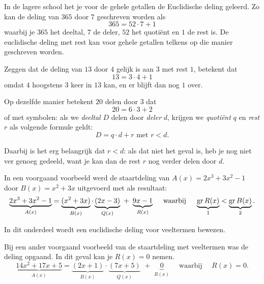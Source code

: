 \documentclass{ximera}
\begin{document}
	\author{Koen de Naeghel - Wiskunde Op Maat}
    \xmsource



In de lagere school het je voor de gehele getallen de Euclidische deling geleerd. Zo kan de deling van $365$ door $7$ geschreven worden als
\[
365 = 52 \cdot 7 + 1
\]
waarbij je $365$ het deeltal, $7$ de deler, $52$ het quotiënt en $1$ de rest is. De euclidische deling met rest kan voor gehele getallen telkens op die manier geschreven worden. 


\begin{example}\nl
         
	Zeggen dat de deling van $13$ door $4$ gelijk is aan $3$ met rest $1$, betekent dat
	\[
	13 = 3 \cdot 4  + 1
	\]
	omdat $4$ hoogstens $3$ keer in $13$ kan, en er blijft dan nog $1$ over.
	 
	Op dezelfde manier betekent $20$ delen door $3$ dat
	\[
	20 = 6\cdot 3 + 2
	\]
	of met symbolen: als we \textit{deeltal} $D$ delen door \textit{deler} $d$, krijgen we \textit{quotiënt} $q$ en \textit{rest} $r$ als volgende formule geldt:
	$$
	D = q\cdot d + r   \text{ met $r<d$}.
	$$
	 
	 
	Daarbij is het erg belangrijk dat $r<d$: als dat niet het geval is, heb je nog niet ver genoeg gedeeld, want je kan dan de rest $r$ nog verder delen door $d$.
	 
\end{example}







In een voorgaand voorbeeld werd de staartdeling van $A(x) = 2x^3+3x^2-1$ door $B(x) = x^2+3x$ uitgevoerd met als resultaat: 
\[
\underbrace{2x^3+3x^2-1}_{A(x)} = \underbrace{(x^2+3x)}_{B(x)}\cdot\underbrace{(2x-3)}_{Q(x)} \,\, + \,\, \underbrace{9x-1}_{R(x)} \quad \text{ waarbij } \quad \underbrace{\operatorname{gr} R(x)}_{1} < \underbrace{\operatorname{gr} B(x)}_{2}.
\]

In dit onderdeel wordt een euclidische deling voor veeltermen bewezen.


Bij een ander voorgaand voorbeeld van de staartdeling met veeltermen was de deling opgaand. In dit geval kan je \( R(x) = 0\) nemen. 
\[
\underbrace{14x^2+17x+5}_{A(x)} = \underbrace{(2x+1)}_{B(x)}\cdot\underbrace{(7x+5)}_{Q(x)} \,\, + \,\, \underbrace{0}_{R(x)} \quad \text{ waarbij } \quad R(x) = 0.
\]
\end{document}
